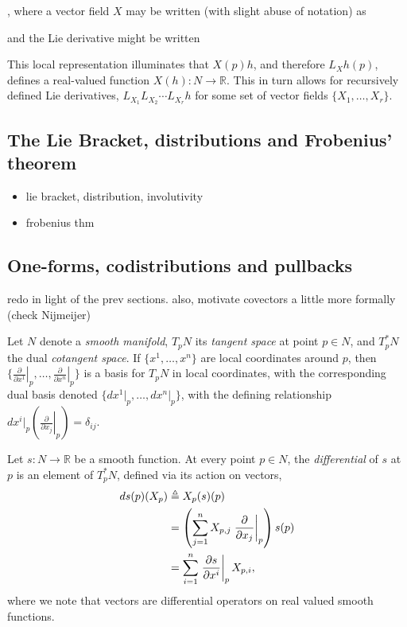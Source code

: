 \documentclass[psamsfonts]{amsart}
\theoremstyle{definition}
\theoremstyle{remark}
\newcommand*\R{\mathds{R}}
\newcommand*\isdefined{\triangleq}
\numberwithin{equation}{section}
\begin{document}
, where a vector field $X$ may be written (with slight abuse of notation) as

 and the Lie derivative might be written 


This local representation illuminates that $X(p)h$, and therefore $L_Xh(p)$, defines a real-valued function $X(h):N\rightarrow \R$. This in turn allows for recursively defined Lie derivatives, $L_{X_{1}}L_{X_{2}}\cdots L_{X_{r}}h$ for some set of vector fields $\{X_1, \dots , X_r\}$.



\subsection{The Lie Bracket, distributions and Frobenius' theorem}\label{sec:prelim-frobenius}


\begin{itemize}
    \item lie bracket, distribution, involutivity
    \item frobenius thm
\end{itemize}


\subsection{One-forms, codistributions and pullbacks}
redo in light of the prev sections. also, motivate covectors a little more formally (check Nijmeijer)

Let $N$ denote a \textit{smooth manifold}, $T_pN $ its \textit{tangent space} at point $p \in N$, and $T^*_pN$ the dual \textit{cotangent space}. If $\{x^1, \dots, x^n\}$ are local coordinates around $p$, then
 $\{\left.\frac{\partial}{\partial x^1}\right\rvert_p,\dots, \left.\frac{\partial}{\partial x^n}\right\rvert_p \}$ is a basis for $T_pN$ in local coordinates, with the corresponding dual basis denoted $\{dx^1\vert_p, \dots, dx^n\vert_p\}$, with the defining relationship $dx^i\vert_p \left(\left.\frac{\partial}{\partial x_j}\right\rvert_p\right) = \delta_{ij}$. 
 
 Let $s: N \rightarrow \R$ be a smooth function. At every point $p \in N$, the \textit{differential} of $s$ at $p$ is an element of $T^*_pN$, defined via its action on vectors, 
\begin{align}
    ds(p)(X_p) & \isdefined X_p(s)(p) \label{def:differential} \\%
     & = \left(\sum_{j = 1}^nX_{p, j}\left.\frac{\partial}{\partial x_j}\right\rvert_p\right)s(p) \notag \\
     & = \sum_{i = 1}^n \left.\frac{\partial s}{\partial x^i} \right\rvert_p X_{p, i}, \notag
\end{align}
where we note that vectors are differential operators on real valued smooth functions. 
\end{document}
